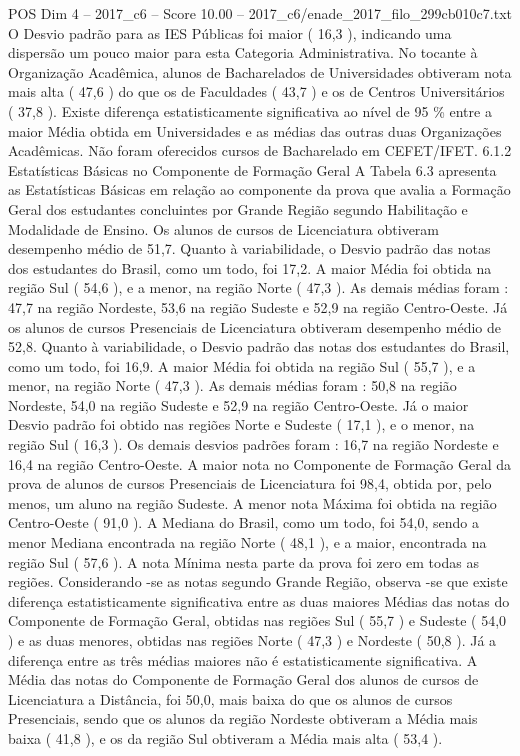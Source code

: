 \begin{textsample}{POS Dim 4 – 2017\_c6 – Score 10.00 – 2017\_c6/enade\_2017\_filo\_299cb010c7.txt}
O Desvio padrão para as IES Públicas foi maior ( 16,3 ), indicando uma dispersão um pouco maior para esta Categoria Administrativa.
No tocante à Organização Acadêmica, alunos de Bacharelados de Universidades obtiveram nota mais alta ( 47,6 ) do que os de Faculdades ( 43,7 ) e os de Centros Universitários ( 37,8 ).
Existe diferença estatisticamente significativa ao nível de 95 \% entre a maior Média obtida em Universidades e as médias das outras duas Organizações Acadêmicas.
Não foram oferecidos cursos de Bacharelado em CEFET/IFET. 6.1.2 Estatísticas Básicas no Componente de Formação Geral A Tabela 6.3 apresenta as Estatísticas Básicas em relação ao componente da prova que avalia a Formação Geral dos estudantes concluintes por Grande Região segundo Habilitação e Modalidade de Ensino.
Os alunos de cursos de Licenciatura obtiveram desempenho médio de 51,7.
Quanto à variabilidade, o Desvio padrão das notas dos estudantes do Brasil, como um todo, foi 17,2.
A maior Média foi obtida na região Sul ( 54,6 ), e a menor, na região Norte ( 47,3 ).
As demais médias foram : 47,7 na região Nordeste, 53,6 na região Sudeste e 52,9 na região Centro-Oeste.
Já os alunos de cursos Presenciais de Licenciatura obtiveram desempenho médio de 52,8.
Quanto à variabilidade, o Desvio padrão das notas dos estudantes do Brasil, como um todo, foi 16,9.
A maior Média foi obtida na região Sul ( 55,7 ), e a menor, na região Norte ( 47,3 ).
As demais médias foram : 50,8 na região Nordeste, 54,0 na região Sudeste e 52,9 na região Centro-Oeste.
Já o maior Desvio padrão foi obtido nas regiões Norte e Sudeste ( 17,1 ), e o menor, na região Sul ( 16,3 ).
Os demais desvios padrões foram : 16,7 na região Nordeste e 16,4 na região Centro-Oeste.
A maior nota no Componente de Formação Geral da prova de alunos de cursos Presenciais de Licenciatura foi 98,4, obtida por, pelo menos, um aluno na região Sudeste.
A menor nota Máxima foi obtida na região Centro-Oeste ( 91,0 ).
A Mediana do Brasil, como um todo, foi 54,0, sendo a menor Mediana encontrada na região Norte ( 48,1 ), e a maior, encontrada na região Sul ( 57,6 ).
A nota Mínima nesta parte da prova foi zero em todas as regiões.
Considerando -se as notas segundo Grande Região, observa -se que existe diferença estatisticamente significativa entre as duas maiores Médias das notas do Componente de Formação Geral, obtidas nas regiões Sul ( 55,7 ) e Sudeste ( 54,0 ) e as duas menores, obtidas nas regiões Norte ( 47,3 ) e Nordeste ( 50,8 ).
Já a diferença entre as três médias maiores não é estatisticamente significativa.
A Média das notas do Componente de Formação Geral dos alunos de cursos de Licenciatura a Distância, foi 50,0, mais baixa do que os alunos de cursos Presenciais, sendo que os alunos da região Nordeste obtiveram a Média mais baixa ( 41,8 ), e os da região Sul obtiveram a Média mais alta ( 53,4 ).

\end{textsample}
